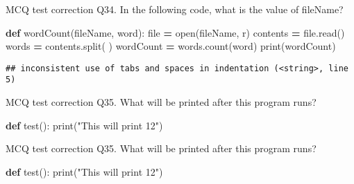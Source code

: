 \documentclass[
  8pt,
  ignorenonframetext,
]{beamer}
\newenvironment{Shaded}{\begin{snugshade}}{\end{snugshade}}
\newcommand{\BuiltInTok}[1]{#1}
\newcommand{\KeywordTok}[1]{\textcolor[rgb]{0.13,0.29,0.53}{\textbf{#1}}}
\newcommand{\NormalTok}[1]{#1}
\newcommand{\OperatorTok}[1]{\textcolor[rgb]{0.81,0.36,0.00}{\textbf{#1}}}
\newcommand{\StringTok}[1]{\textcolor[rgb]{0.31,0.60,0.02}{#1}}
\begin{document}
\begin{frame}[fragile]{MCQ test correction}
\protect\hypertarget{mcq-test-correction-67}{}
Q34. In the following code, what is the value of fileName?

\begin{Shaded}
\begin{Highlighting}[]
\KeywordTok{def}\NormalTok{ wordCount(fileName, word):}
    \BuiltInTok{file}  \OperatorTok{=} \BuiltInTok{open}\NormalTok{(fileName, }\StringTok{\textquotesingle{}r\textquotesingle{}}\NormalTok{)}
\NormalTok{    contents }\OperatorTok{=} \BuiltInTok{file}\NormalTok{.read()}
\NormalTok{    words }\OperatorTok{=}\NormalTok{ contents.split(}\StringTok{\textquotesingle{} \textquotesingle{}}\NormalTok{)}
\NormalTok{        wordCount }\OperatorTok{=}\NormalTok{ words.count(word)}
        \BuiltInTok{print}\NormalTok{(wordCount)}
\end{Highlighting}
\end{Shaded}

\begin{verbatim}
## inconsistent use of tabs and spaces in indentation (<string>, line 5)
\end{verbatim}
\end{frame}

\begin{frame}[fragile]{MCQ test correction}
\protect\hypertarget{mcq-test-correction-68}{}
Q35. What will be printed after this program runs?

\begin{Shaded}
\begin{Highlighting}[]
\KeywordTok{def}\NormalTok{ test():}
    \BuiltInTok{print}\NormalTok{(}\StringTok{"This will print 12"}\NormalTok{)}
\end{Highlighting}
\end{Shaded}
\end{frame}

\begin{frame}[fragile]{MCQ test correction}
\protect\hypertarget{mcq-test-correction-69}{}
Q35. What will be printed after this program runs?

\begin{Shaded}
\begin{Highlighting}[]
\KeywordTok{def}\NormalTok{ test():}
    \BuiltInTok{print}\NormalTok{(}\StringTok{"This will print 12"}\NormalTok{)}
\end{Highlighting}
\end{Shaded}
\end{frame}
\end{document}
